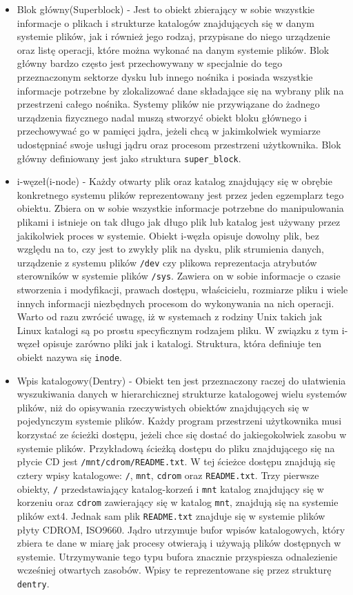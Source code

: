 \documentclass[11pt]{scrartcl}
\begin{document}
\begin{itemize}
\item
  Blok główny(Superblock) - Jest to obiekt zbierający w sobie wszystkie informacje o plikach i strukturze katalogów znajdujących się w danym systemie plików, jak i również jego rodzaj, przypisane do niego urządzenie oraz listę operacji, które można wykonać na danym systemie plików. Blok główny bardzo często jest przechowywany w specjalnie do tego przeznaczonym sektorze dysku lub innego nośnika i posiada wszystkie informacje potrzebne by zlokalizować dane składające się na wybrany plik na przestrzeni całego nośnika. Systemy plików nie przywiązane do żadnego urządzenia fizycznego nadal muszą stworzyć obiekt bloku głównego i przechowywać go w pamięci jądra, jeżeli chcą w jakimkolwiek wymiarze udostępniać swoje usługi jądru oraz procesom przestrzeni użytkownika. Blok główny definiowany jest jako struktura \texttt{super\_block}.
\item
  i-węzeł(i-node) - Każdy otwarty plik oraz katalog znajdujący się w obrębie konkretnego systemu plików reprezentowany jest przez jeden egzemplarz tego obiektu. Zbiera on w sobie wszystkie informacje potrzebne do manipulowania plikami i istnieje on tak długo jak długo plik lub katalog jest używany przez jakikolwiek proces w systemie.  Obiekt i-węzła opisuje dowolny plik, bez względu na to, czy jest to zwykły plik na dysku, plik strumienia danych, urządzenie z systemu plików \texttt{/dev} czy plikowa reprezentacja atrybutów sterowników w systemie plików \texttt{/sys}. Zawiera on w sobie informacje o czasie stworzenia i modyfikacji, prawach dostępu, właścicielu, rozmiarze pliku i wiele innych informacji niezbędnych procesom do wykonywania na nich operacji. Warto od razu zwrócić uwagę, iż w systemach z rodziny Unix takich jak Linux katalogi są po prostu specyficznym rodzajem pliku. W związku z tym i-węzeł opisuje zarówno pliki jak i katalogi. Struktura, która definiuje ten obiekt nazywa się \texttt{inode}.
\item
  Wpis katalogowy(Dentry) - Obiekt ten jest przeznaczony raczej do ułatwienia wyszukiwania danych w hierarchicznej strukturze katalogowej wielu systemów plików, niż do opisywania rzeczywistych obiektów znajdujących się w pojedynczym systemie plików. Każdy program przestrzeni użytkownika musi korzystać ze ścieżki dostępu, jeżeli chce się dostać do jakiegokolwiek zasobu w systemie plików. Przykładową ścieżką dostępu do pliku znajdującego się na płycie CD jest \texttt{/mnt/cdrom/README.txt}. W tej ścieżce dostępu znajdują się cztery wpisy katalogowe: \texttt{/}, \texttt{mnt}, \texttt{cdrom} oraz \texttt{README.txt}. Trzy pierwsze obiekty, \texttt{/} przedstawiający katalog-korzeń i \texttt{mnt} katalog znajdujący się w korzeniu oraz \texttt{cdrom} zawierający się w katalog \texttt{mnt}, znajdują się na systemie plików ext4. Jednak sam plik \texttt{README.txt} znajduje się w systemie plików płyty CDROM, ISO9660. Jądro utrzymuje bufor wpisów katalogowych, który zbiera te dane w miarę jak procesy otwierają i używają plików dostępnych w systemie. Utrzymywanie tego typu bufora znacznie przyspiesza odnalezienie wcześniej otwartych zasobów. Wpisy te reprezentowane się przez strukturę \texttt{dentry}.

\end{itemize}
\end{document}
